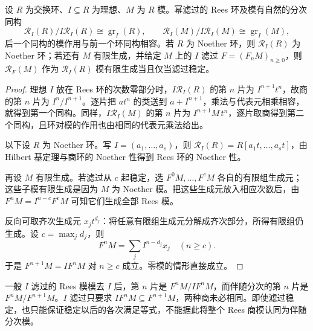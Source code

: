 \begin{proposition}\label{b3:prop:rees-finiteness}
	设 \(R\) 为交换环、\(I\subseteq R\) 为理想、\(M\) 为 \(R\) 模。幂滤过的 Rees 环及模有自然的分次同构
	\[
		\mathcal R_I(R)/I\mathcal R_I(R)\cong\operatorname{gr}_I(R), \qquad \mathcal R_I(M)/I\mathcal R_I(M)\cong\operatorname{gr}_I(M),
	\]
	后一个同构的模作用与前一个环同构相容。若 \(R\) 为 Noether 环，则 \(\mathcal R_I(R)\) 为 Noether 环；若还有 \(M\) 有限生成，并给定 \(M\) 上的 \(I\) 滤过 \(F=(F_nM)_{n\ge0}\)，则 \(\mathcal R_F(M)\) 作为 \(\mathcal R_I(R)\) 模有限生成当且仅当滤过稳定。
\end{proposition}
\begin{proof}
	理想 \(I\) 放在 Rees 环的次数零部分时，\(I\mathcal R_I(R)\) 的第 \(n\) 片为 \(I^{n+1}t^n\)，故商的第 \(n\) 片为 \(I^n/I^{n+1}\)。逐片把 \(at^n\) 的类送到 \(a+I^{n+1}\)，乘法与代表元相乘相容，就得到第一个同构。同样，\(I\mathcal R_I(M)\) 的第 \(n\) 片为 \(I^{n+1}M\,t^n\)，逐片取商得到第二个同构，且环对模的作用也由相同的代表元乘法给出。

	以下设 \(R\) 为 Noether 环。写 \(I=(a_1,\ldots,a_s)\)，则 \(\mathcal R_I(R)=R[a_1t,\ldots,a_st]\)，由 Hilbert 基定理与商环的 Noether 性得到 Rees 环的 Noether 性。

	再设 \(M\) 有限生成。若滤过从 \(c\) 起稳定，选 \(F^0M,\ldots,F^cM\) 各自的有限组生成元；这些子模有限生成是因为 \(M\) 为 Noether 模。把这些生成元放入相应次数后，由 \(F^nM=I^{n-c}F^cM\) 可知它们生成全部 Rees 模。

	反向可取齐次生成元 \(x_jt^{d_j}\)：将任意有限组生成元分解成齐次部分，所得有限组仍生成。设 \(c=\max_jd_j\)，则
	\[
		F^nM=\sum_jI^{n-d_j}x_j\quad(n\ge c).
	\]
	于是 \(F^{n+1}M=IF^nM\) 对 \(n\ge c\) 成立。零模的情形直接成立。
\end{proof}

一般 \(I\) 滤过的 Rees 模模去 \(I\) 后，第 \(n\) 片是 \(F^nM/IF^nM\)，而伴随分次的第 \(n\) 片是 \(F^nM/F^{n+1}M\)。\(I\) 滤过只要求 \(IF^nM\subseteq F^{n+1}M\)，两种商未必相同。即使滤过稳定，也只能保证稳定以后的各次满足等式，不能据此将整个 Rees 商模认同为伴随分次模。

